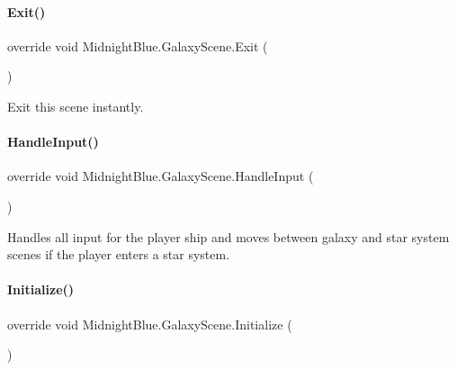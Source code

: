 \paragraph{\texorpdfstring{Exit()}{Exit()}}
{\footnotesize\ttfamily override void Midnight\+Blue.\+Galaxy\+Scene.\+Exit (\begin{DoxyParamCaption}{ }\end{DoxyParamCaption})\hspace{0.3cm}{\ttfamily [inline]}}



Exit this scene instantly. 

\hypertarget{class_midnight_blue_1_1_galaxy_scene_afd7f8c9f6d0cf6ded10299d4b0015c29}{}\label{class_midnight_blue_1_1_galaxy_scene_afd7f8c9f6d0cf6ded10299d4b0015c29} 
\paragraph{\texorpdfstring{Handle\+Input()}{HandleInput()}}
{\footnotesize\ttfamily override void Midnight\+Blue.\+Galaxy\+Scene.\+Handle\+Input (\begin{DoxyParamCaption}{ }\end{DoxyParamCaption})\hspace{0.3cm}{\ttfamily [inline]}}



Handles all input for the player ship and moves between galaxy and star system scenes if the player enters a star system. 

\hypertarget{class_midnight_blue_1_1_galaxy_scene_a97d97e56a73d9a4b7caf6dd6ce86647e}{}\label{class_midnight_blue_1_1_galaxy_scene_a97d97e56a73d9a4b7caf6dd6ce86647e} 
\paragraph{\texorpdfstring{Initialize()}{Initialize()}}
{\footnotesize\ttfamily override void Midnight\+Blue.\+Galaxy\+Scene.\+Initialize (\begin{DoxyParamCaption}{ }\end{DoxyParamCaption})\hspace{0.3cm}{\ttfamily [inline]}}




